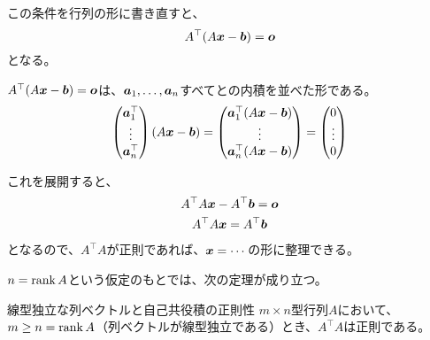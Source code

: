 \documentclass[../../../topic_linear-algebra]{subfiles}
\begin{document}
この条件を行列の形に書き直すと、
\begin{equation*}
  A^\top (A\vb*{x} - \vb*{b}) = \vb*{o}
\end{equation*}
となる。

\br

\begin{handout}
  $A^\top (A\vb*{x} - \vb*{b}) = \vb*{o}$は、$\vb*{a}_1, \ldots, \vb*{a}_n$すべてとの内積を並べた形である。
\begin{equation*}
  \begin{pmatrix}
    \vb*{a}_1^\top \\
    \vdots \\
    \vb*{a}_n^\top
  \end{pmatrix} (A\vb*{x} - \vb*{b})
  = \begin{pmatrix}
    \vb*{a}_1^\top (A\vb*{x} - \vb*{b}) \\
    \vdots \\
    \vb*{a}_n^\top (A\vb*{x} - \vb*{b})
  \end{pmatrix}
  = \begin{pmatrix}
    0 \\
    \vdots \\
    0
  \end{pmatrix}
\end{equation*}
\end{handout}

これを展開すると、
\begin{gather*}
  A^\top A \vb*{x} - A^\top \vb*{b} = \vb*{o} \\
  A^\top A \vb*{x} = A^\top \vb*{b}
\end{gather*}
となるので、$A^\top A$が正則であれば、$\vb*{x} = \cdots$の形に整理できる。

\br

$n = \rank A$という仮定のもとでは、次の定理が成り立つ。

\begin{theorem*}{線型独立な列ベクトルと自己共役積の正則性}
  $m \times n$型行列$A$において、$m \geq n = \rank A$（列ベクトルが線型独立である）とき、$A^\top A$は正則である。
\end{theorem*}
\end{document}
